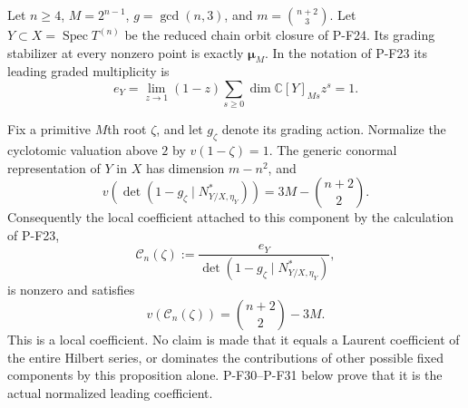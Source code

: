 \begin{proposition}
\label{prop:chainlocalcoefficient}
Let $n\ge4$, $M=2^{n-1}$, $g=\gcd(n,3)$, and
$m=\binom{n+2}{3}$. Let $Y\subset X=\operatorname{Spec}T^{(n)}$
be the reduced chain orbit closure of P-F24. Its grading
stabilizer at every nonzero point is exactly
$\boldsymbol\mu_M$. In the notation of P-F23 its leading
graded multiplicity is
\[
 e_Y=\lim_{z\to1}(1-z)
           \sum_{s\ge0}\dim\mathbb C[Y]_{Ms}z^s=1.
 \tag{P-F28a}
\]

Fix a primitive $M$th root $\zeta$, and let $g_\zeta$
denote its grading action. Normalize the cyclotomic
valuation above $2$ by $v(1-\zeta)=1$. The generic
conormal representation of $Y$ in $X$ has dimension
$m-n^2$, and
\[
 v\!\left(\det(1-g_\zeta\mid N^*_{Y/X,\eta_Y})\right)
       =3M-\binom{n+2}{2}.
 \tag{P-F28b}
\]
Consequently the local coefficient attached to this
component by the calculation of P-F23,
\[
 \mathcal C_n(\zeta):=
   \frac{e_Y}{\det(1-g_\zeta\mid N^*_{Y/X,\eta_Y})},
\]
is nonzero and satisfies
\[
 v(\mathcal C_n(\zeta))=\binom{n+2}{2}-3M.
 \tag{P-F28c}
\]
This is a local coefficient. No claim is made that it
equals a Laurent coefficient of the entire Hilbert series,
or dominates the contributions of other possible fixed components
by this proposition alone. P-F30--P-F31 below prove that it is
the actual normalized leading coefficient.
\end{proposition}

